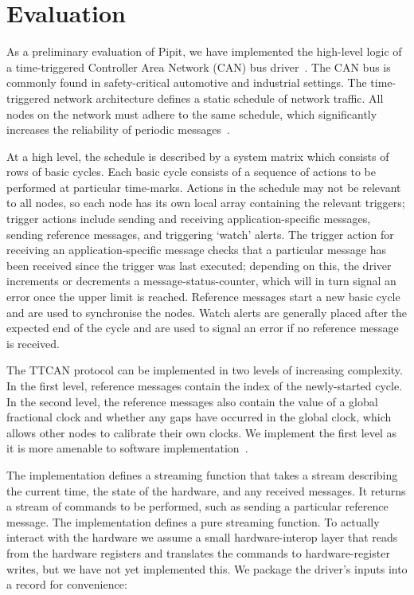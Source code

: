 
\section{Evaluation}
\label{s:evaluation}

As a preliminary evaluation of Pipit, we have implemented the high-level logic of a time-triggered Controller Area Network (CAN) bus driver~\cite{ISO11898_4}.
The CAN bus is commonly found in safety-critical automotive and industrial settings.
The time-triggered network architecture defines a static schedule of network traffic.
All nodes on the network must adhere to the same schedule, which significantly increases the reliability of periodic messages~\cite{fuehrer2001time}.

At a high level, the schedule is described by a system matrix which consists of rows of basic cycles.
Each basic cycle consists of a sequence of actions to be performed at particular time-marks.
Actions in the schedule may not be relevant to all nodes, so each node has its own local array containing the relevant triggers; trigger actions include sending and receiving application-specific messages, sending reference messages, and triggering `watch' alerts.
The trigger action for receiving an application-specific message checks that a particular message has been received since the trigger was last executed; depending on this, the driver increments or decrements a message-status-counter, which will in turn signal an error once the upper limit is reached.
Reference messages start a new basic cycle and are used to synchronise the nodes.
Watch alerts are generally placed after the expected end of the cycle and are used to signal an error if no reference message is received.

The TTCAN protocol can be implemented in two levels of increasing complexity.
In the first level, reference messages contain the index of the newly-started cycle.
In the second level, the reference messages also contain the value of a global fractional clock and whether any gaps have occurred in the global clock, which allows other nodes to calibrate their own clocks.
We implement the first level as it is more amenable to software implementation~\cite{hartwich2002integration}.

The implementation defines a streaming function that takes a stream describing the current time, the state of the hardware, and any received messages.
It returns a stream of commands to be performed, such as sending a particular reference message.
The implementation defines a pure streaming function.
To actually interact with the hardware we assume a small hardware-interop layer that reads from the hardware registers and translates the commands to hardware-register writes, but we have not yet implemented this.
We package the driver's inputs into a record for convenience:

